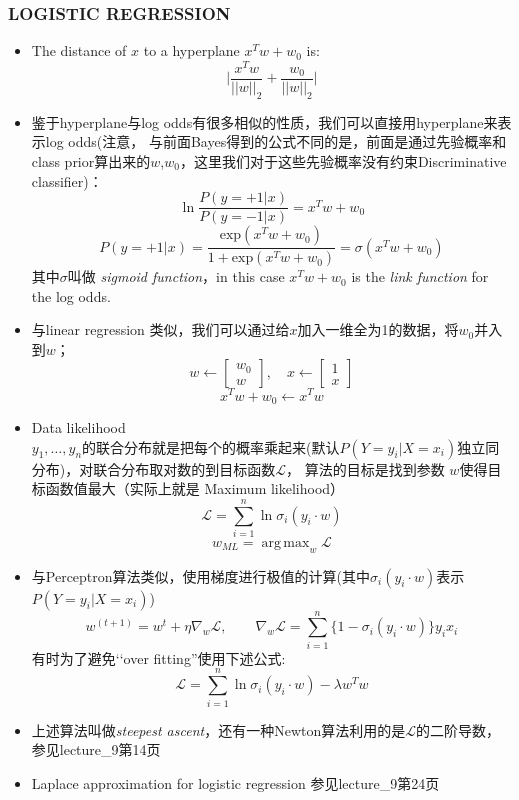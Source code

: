 \documentclass{article} 	%
\DeclareMathOperator*{\argmax}{arg\,max}
\begin{document}
		\subsubsection{LOGISTIC REGRESSION}
			\begin{itemize}
			\item
			The distance of $x$ to a hyperplane $x^Tw + w_0$ is:
			$$\Big|\frac{x^Tw}{||w||_2} + \frac{w_0}{||w||_2}\Big|$$
			\item
			鉴于hyperplane与log odds有很多相似的性质，我们可以直接用hyperplane来表示log odds(注意，
			与前面Bayes得到的公式不同的是，前面是通过先验概率和class prior算出来的$w$,$w_0$，这里我们对于这些先验概率没有约束Discriminative
			 classifier)：
			$$\ln \frac{P(y = +1|x)}{P(y = -1|x)} = x^Tw+w_0$$
			$$P(y=+1|x) = \frac{\mathrm{exp}(x^Tw+w_0)}{1+\mathrm{exp}(x^Tw+w_0)}=\sigma(x^Tw+w_0)$$
			其中$\sigma$叫做 \emph{sigmoid function}，in this case $x^Tw+w_0$ is the \emph{link function} for the log odds.
			\item
			与linear regression 类似，我们可以通过给$x$加入一维全为1的数据，将$w_0$并入到$w$；
			$$
			w\gets\left[ 
			\begin{array}{c}
			w_0\\w
			\end{array}\right],\quad
			x\gets\left[
			\begin{array}{c}
			1\\x
			\end{array}
			\right]
			$$
			$$x^Tw + w_0\gets x^Tw$$
			\item
			Data likelihood\\
			$y_1,\ldots,y_n$的联合分布就是把每个的概率乘起来(默认$P(Y = y_i|X=x_i)$独立同分布)，对联合分布取对数的到目标函数$\mathcal{L}$，
			算法的目标是找到参数
			$w$使得目标函数值最大（实际上就是 Maximum likelihood）\\
			$$\mathcal{L} = \sum_{i=1}^n\ln \sigma_i(y_i\cdot w)$$
			$$w_{\scriptscriptstyle{ML}} = \argmax_{w}\mathcal{L}$$
			\item
			与Perceptron算法类似，使用梯度进行极值的计算(其中$\sigma_i(y_i\cdot w)$表示$P(Y = y_i|X=x_i)$)\\
			$$w^{(t+1)}=w^t + \eta \nabla_w\mathcal{L},\quad \quad \nabla_w\mathcal{L} = \sum_{i=1}^n\{1-\sigma_i(y_i\cdot w)\}y_ix_i$$
			有时为了避免‘‘over fitting''使用下述公式:
			$$\mathcal{L} = \sum_{i=1}^n\ln \sigma_i(y_i\cdot w) - \lambda w^Tw$$
			\item
			上述算法叫做\emph{steepest ascent}，还有一种Newton算法利用的是$\mathcal{L}$的二阶导数，参见lecture\_9第14页\\
			\item
			Laplace approximation for logistic regression 参见lecture\_9第24页\\
			\end{itemize}
			
	
	
			
		
	
\end{document}
